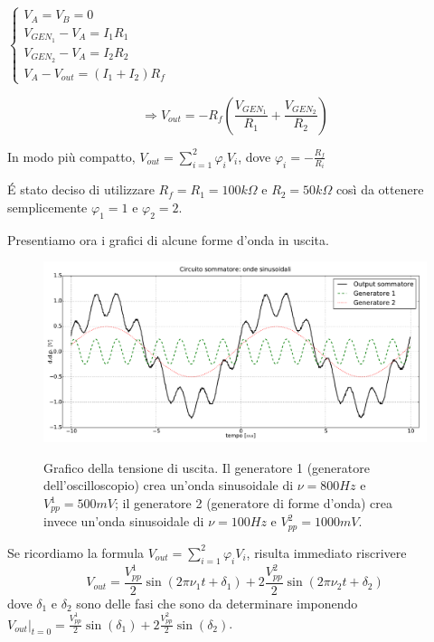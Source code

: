 $\begin{cases} V_A=V_B=0 \\ V_{{GEN}_1} - V_A =I_1 R_1  \\ V_{{GEN}_2} - V_A =I_2 R_2 \\ V_A - V_{out} =(I_1+I_2) R_f \end{cases} $


$$\Rightarrow V_{out}=-R_f \left( \frac{V_{{GEN}_1}}{R_1}+\frac{V_{{GEN}_2}}{R_2}\right)$$


In modo più compatto, $V_{out}=\sum^{2}_{i=1} \varphi_i V_{i}$, dove $\varphi_i=-\frac{R_f}{R_i}$ 

\'E stato deciso di utilizzare $R_f=R_1=100 k\Omega$ e $R_2=50 k\Omega$ così da ottenere semplicemente $\varphi_1=1$ e $\varphi_2=2$.

Presentiamo ora i grafici di alcune forme d'onda in uscita.

\begin{figure}[H]
 \centering
   {\includegraphics[width=15cm]{../E01/latex/sinsin.pdf}}
 \caption{Grafico della tensione di uscita. Il generatore 1 (generatore dell'oscilloscopio) crea un'onda sinusoidale di $\nu=800 Hz$ e $V^1_{pp}=500 mV$; il generatore 2 (generatore di forme d'onda) crea invece un'onda sinusoidale di $\nu=100 Hz$ e $V^2_{pp}=1000 mV$.}
 \label{gr:onde1}
\end{figure}

Se ricordiamo la formula $V_{out}=\sum^{2}_{i=1} \varphi_i V_{i}$, risulta immediato riscrivere 
\begin{equation}
V_{out}=\frac{V^1_{pp}}{2}\sin(2 \pi \nu_1t+ \delta_1)+2\frac{V^2_{pp}}{2}\sin(2 \pi \nu_2t+ \delta_2)
\label{eq:batt}
\end{equation}
dove $\delta_1$ e $\delta_2$ sono delle fasi che sono da determinare imponendo $V_{out} \vert_{t=0}=\frac{V^1_{pp}}{2}\sin(\delta_1)+2\frac{V^2_{pp}}{2}\sin(\delta_2)$. 


